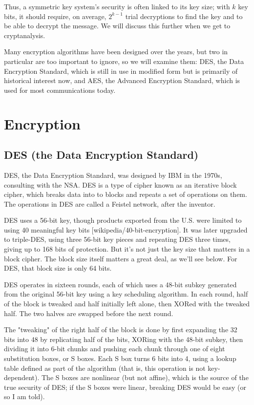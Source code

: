 \documentclass[%
 aip,
 jmp,%
 amsmath,amssymb,
 reprint,%
]{revtex4-1}
\begin{document}
Thus, a symmetric key system's security is often linked to its key
size; with $k$ key bits, it should require, on average, $2^{k-1}$
trial decryptions to find the key and to be able to decrypt the
message.  We will discuss this further when we get to cryptanalysis.

Many encryption algorithms have been designed over the years, but two
in particular are too important to ignore, so we will examine them:
DES, the Data Encryption Standard, which is still in use in modified
form but is primarily of historical interest now, and AES, the
Advanced Encryption Standard, which is used for most communications
today.

\section{Encryption}

\subsection{DES (the Data Encryption Standard)}

DES, the Data Encryption Standard, was designed by IBM in the 1970s,
consulting with the NSA.  DES is a type of cipher known as an
iterative block cipher, which breaks data into to blocks and repeats a
set of operations on them.  The operations in DES are called a Feistel
network, after the inventor.

DES uses a 56-bit key, though products exported from the U.S. were
limited to using 40 meaningful key bits [wikipedia/40-bit-encryption].
It was later upgraded to triple-DES, using three 56-bit key pieces and
repeating DES three times, giving up to 168 bits of protection.  But
it's not just the key size that matters in a block cipher.  The block
size itself matters a great deal, as we'll see below.  For DES, that
block size is only 64 bits.

DES operates in sixteen rounds, each of which uses a 48-bit subkey
generated from the original 56-bit key using a key scheduling
algorithm.  In each round, half of the block is tweaked and half
initially left alone, then XORed with the tweaked half.  The two
halves are swapped before the next round.

The "tweaking" of the right half of the block is done by first
expanding the 32 bits into 48 by replicating half of the bits, XORing
with the 48-bit subkey, then dividing it into 6-bit chunks and pushing
each chunk through one of eight substitution boxes, or S boxes.  Each
S box turns 6 bits into 4, using a lookup table defined as part of the
algorithm (that is, this operation is not key-dependent).  The S boxes
are nonlinear (but not affine), which is the source of the true
security of DES; if the S boxes were linear, breaking DES would be
easy (or so I am told).
\end{document}
